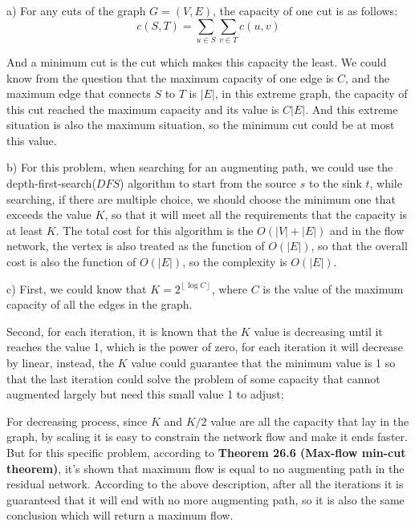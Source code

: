 \documentclass{article}
\begin{document}
a) For any cuts of the graph $G=(V, E)$, the capacity of one cut is as follows:
$$c(S, T) = \sum_{u\in{S}}\sum_{v\in{T}}c(u, v)$$

And a minimum cut is the cut which makes this capacity the least. We could know from the question that the maximum 
capacity of one edge is $C$, and the maximum edge that connects $S$ to $T$ is $|E|$, in this extreme graph, the capacity
of this cut reached the maximum capacity and its value is $C|E|$. And this extreme situation is also the maximum situation, so the minimum cut could be at most this value.

b) For this problem, when searching for an augmenting path, we could use the depth-first-search($DFS$) algorithm to start from the source $s$ to the sink $t$, while searching, if there are multiple choice, we should choose the minimum one that exceeds the value $K$, so that it will meet all the requirements that the capacity is at least $K$. The total cost for this algorithm is the $O(|V|+|E|)$ and in the flow network, the vertex is also treated as the function of $O(|E|)$, so that the overall cost is also the function of $O(|E|)$, so the complexity is $O(|E|)$.

c) First, we could know that $K=2^{\left \lfloor{\log{C}}\right \rfloor}$, where $C$ is the value of the maximum capacity of all the edges in the graph.

Second, for each iteration, it is known that the $K$ value is decreasing until it reaches the value 1, which is the power of zero, for each iteration it will decrease by linear, instead, the $K$ value could guarantee that the minimum
value is 1 so that the last iteration could solve the problem of some capacity that cannot augmented largely but need this small value 1 to adjust;

For decreasing process, since $K$  and $K/2$ value are all the capacity that lay in the graph, by scaling it is easy
to constrain the network flow and make it ends faster. But for this specific problem, according to \textbf{Theorem 26.6 (Max-flow min-cut theorem)}, it's shown that maximum flow is equal to no augmenting path in the residual network. According to the above description, after all the iterations it is guaranteed that it will end with no more augmenting path, so it is also the same conclusion which will return a maximum flow.
\end{document}
